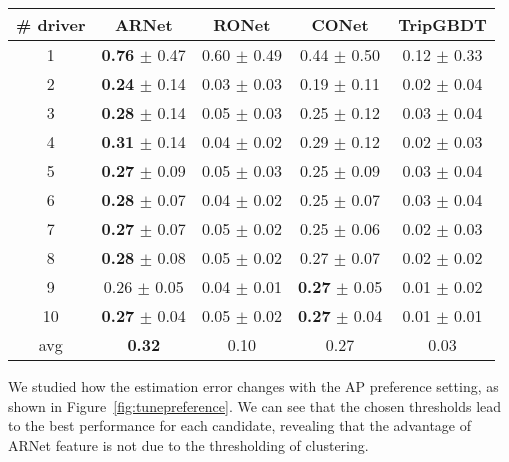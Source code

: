 \documentclass{article}
\begin{document}
\begin{table}[t]
\label{tab:driverclusteringami}
\tiny
\centering
\begin{tabular}{c|c|c|c|c}%
\hline
\# driver & {ARNet} & {RONet} & {CONet} & {TripGBDT} \\
\hline
1 &	\textbf{0.76} $\pm$ 0.47		& 0.60 $\pm$ 0.49		& 0.44 $\pm$ 0.50				& 0.12 $\pm$ 0.33\\
2 &	\textbf{0.24} $\pm$ 0.14		& 0.03 $\pm$ 0.03		& 0.19 $\pm$ 0.11				& 0.02 $\pm$ 0.04\\
3 &	\textbf{0.28} $\pm$ 0.14		& 0.05 $\pm$ 0.03		& 0.25 $\pm$ 0.12				& 0.03 $\pm$ 0.04\\
4 &	\textbf{0.31} $\pm$ 0.14		& 0.04 $\pm$ 0.02		& 0.29 $\pm$ 0.12				& 0.02 $\pm$ 0.03\\
5 &	\textbf{0.27} $\pm$ 0.09		& 0.05 $\pm$ 0.03		& 0.25 $\pm$ 0.09				& 0.03 $\pm$ 0.04\\
6 &	\textbf{0.28} $\pm$ 0.07		& 0.04 $\pm$ 0.02		& 0.25 $\pm$ 0.07				& 0.03 $\pm$ 0.04\\
7 &	\textbf{0.27} $\pm$ 0.07		& 0.05 $\pm$ 0.02		& 0.25 $\pm$ 0.06				& 0.02 $\pm$ 0.03\\
8 &	\textbf{0.28} $\pm$ 0.08		& 0.05 $\pm$ 0.02		& 0.27 $\pm$ 0.07				& 0.02 $\pm$ 0.02\\
9 &	0.26 $\pm$ 0.05		& 0.04 $\pm$ 0.01		& \textbf{0.27} $\pm$ 0.05					& 0.01 $\pm$ 0.02\\
10&	\textbf{0.27} $\pm$ 0.04		& 0.05 $\pm$ 0.02		& \textbf{0.27} $\pm$ 0.04		& 0.01 $\pm$ 0.01\\
\hline
avg & \textbf{0.32}
	& {0.10}
	& {0.27}
	& 0.03\\
\hline
\end{tabular}
\vspace{-0.03in}
\end{table}

We studied how the estimation error changes with the AP preference setting, as shown in Figure~\ref{fig:tunepreference}.
We can see that the chosen thresholds lead to the best performance for each candidate, revealing that the advantage of ARNet feature is not due to the thresholding of clustering.
\end{document}
